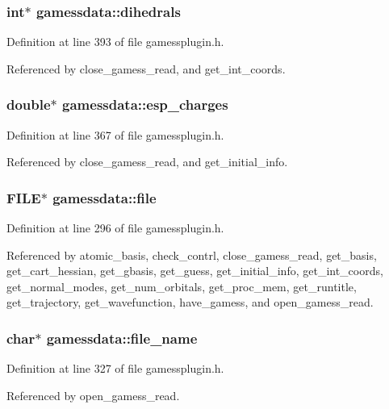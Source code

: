 \subsubsection{\setlength{\rightskip}{0pt plus 5cm}int$\ast$ gamessdata::dihedrals}\label{structgamessdata_m46}




Definition at line 393 of file gamessplugin.h.

Referenced by close\_\-gamess\_\-read, and get\_\-int\_\-coords.
\subsubsection{\setlength{\rightskip}{0pt plus 5cm}double$\ast$ gamessdata::esp\_\-charges}\label{structgamessdata_m34}




Definition at line 367 of file gamessplugin.h.

Referenced by close\_\-gamess\_\-read, and get\_\-initial\_\-info.
\subsubsection{\setlength{\rightskip}{0pt plus 5cm}FILE$\ast$ gamessdata::file}\label{structgamessdata_m0}




Definition at line 296 of file gamessplugin.h.

Referenced by atomic\_\-basis, check\_\-contrl, close\_\-gamess\_\-read, get\_\-basis, get\_\-cart\_\-hessian, get\_\-gbasis, get\_\-guess, get\_\-initial\_\-info, get\_\-int\_\-coords, get\_\-normal\_\-modes, get\_\-num\_\-orbitals, get\_\-proc\_\-mem, get\_\-runtitle, get\_\-trajectory, get\_\-wavefunction, have\_\-gamess, and open\_\-gamess\_\-read.
\subsubsection{\setlength{\rightskip}{0pt plus 5cm}char$\ast$ gamessdata::file\_\-name}\label{structgamessdata_m17}




Definition at line 327 of file gamessplugin.h.

Referenced by open\_\-gamess\_\-read.
